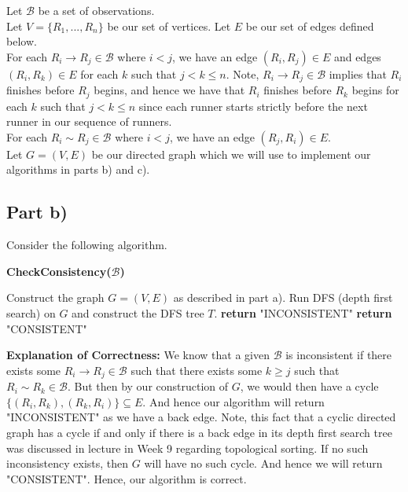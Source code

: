 \documentclass[12pt]{article}
\begin{document}
Let $\mathcal{B}$ be a set of observations. \\

Let $V = \{R_1,...,R_n\}$ be our set of vertices. Let $E$ be our set of edges defined below. \\

For each $R_i \rightarrow R_j \in \mathcal{B}$ where $i < j$, we have an edge $(R_i, R_j) \in E$ and edges $(R_i, R_k) \in  E$ for each $k$ such that $j < k \leq n$. Note, $R_i \rightarrow R_j \in \mathcal{B}$ implies that $R_i$ finishes before $R_j$ begins, and hence we have that $R_i$ finishes before $R_k$ begins for each $k$ such that $j < k \leq n$ since each runner starts strictly before the next runner in our sequence of runners. \\

For each $R_i \sim R_j \in \mathcal{B}$ where $i < j$, we have an edge $(R_j,R_i) \in E$. \\

Let $G = (V,E)$ be our directed graph which we will use to implement our algorithms in parts b) and c). 

\subsection*{Part b)}

Consider the following algorithm. 

\begin{algorithm}[hbt!]
\caption{\textbf{CheckConsistency($\mathcal{B}$)}}\label{alg:cap}

\begin{algorithmic}[1]
\State Construct the graph $G = (V,E)$ as described in part a). 
\State Run DFS (depth first search) on $G$ and construct the DFS tree $T$.
        \State \textbf{return} "INCONSISTENT" 
    \EndIf
\EndFor
\State \textbf{return} "CONSISTENT" 
\end{algorithmic}
\end{algorithm}

\textbf{Explanation of Correctness:} We know that a given $\mathcal{B}$ is inconsistent if there exists some $R_i \rightarrow R_j \in \mathcal{B}$ such that there exists some $k \geq j$ such that $R_i \sim R_k \in \mathcal{B}$. But then by our construction of $G$, we would then have a cycle $\{(R_i,R_k), (R_k, R_i)\} \subseteq E$. And hence our algorithm will return "INCONSISTENT" as we have a back edge. Note, this fact that a cyclic directed graph has a cycle if and only if there is a back edge in its depth first search tree was discussed in lecture in Week 9 regarding topological sorting. If no such inconsistency exists, then $G$ will have no such cycle. And hence we will return "CONSISTENT". Hence, our algorithm is correct. \\
\end{document}
